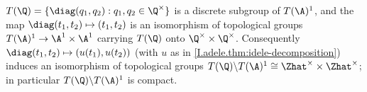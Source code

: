 $T(\Q)=\{\diag(q_1,q_2):q_1,q_2\in\Q^\times\}$ is a discrete subgroup of $T(\A)^1$, and the map
$\diag(t_1,t_2)\mapsto(t_1,t_2)$ is an isomorphism of topological groups $T(\A)^1\to\A^1\times\A^1$ carrying $T(\Q)$
onto $\Q^\times\times\Q^\times$. Consequently $\diag(t_1,t_2)\mapsto(u(t_1),u(t_2))$ (with $u$ as in
\cref{I.adele.thm:idele-decomposition}) induces an isomorphism of topological groups
$T(\Q)\backslash T(\A)^1\cong\Zhat^\times\times\Zhat^\times$; in particular $T(\Q)\backslash T(\A)^1$ is compact.
